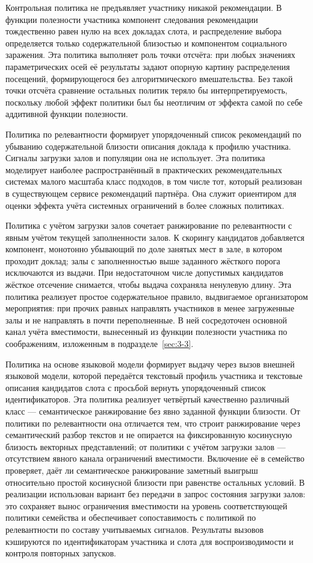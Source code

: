Контрольная политика не предъявляет участнику никакой рекомендации. В функции полезности участника компонент следования рекомендации тождественно равен нулю на всех докладах слота, и распределение выбора определяется только содержательной близостью и компонентом социального заражения. Эта политика выполняет роль точки отсчёта: при любых значениях параметрических осей её результаты задают опорную картину распределения посещений, формирующегося без алгоритмического вмешательства. Без такой точки отсчёта сравнение остальных политик теряло бы интерпретируемость, поскольку любой эффект политики был бы неотличим от эффекта самой по себе аддитивной функции полезности.

Политика по релевантности формирует упорядоченный список рекомендаций по убыванию содержательной близости описания доклада к профилю участника. Сигналы загрузки залов и популяции она не использует. Эта политика моделирует наиболее распространённый в практических рекомендательных системах малого масштаба класс подходов, в том числе тот, который реализован в существующем сервисе рекомендаций партнёра. Она служит ориентиром для оценки эффекта учёта системных ограничений в более сложных политиках.

Политика с учётом загрузки залов сочетает ранжирование по релевантности с явным учётом текущей заполненности залов. К скорингу кандидатов добавляется компонент, монотонно убывающий по доле занятых мест в зале, в котором проходит доклад; залы с заполненностью выше заданного жёсткого порога исключаются из выдачи. При недостаточном числе допустимых кандидатов жёсткое отсечение снимается, чтобы выдача сохраняла ненулевую длину. Эта политика реализует простое содержательное правило, выдвигаемое организатором мероприятия: при прочих равных направлять участников в менее загруженные залы и не направлять в почти переполненные. В ней сосредоточен основной канал учёта вместимости, вынесенный из функции полезности участника по соображениям, изложенным в подразделе~\ref{sec:3-3}.

Политика на основе языковой модели формирует выдачу через вызов внешней языковой модели, которой передаётся текстовый профиль участника и текстовые описания кандидатов слота с просьбой вернуть упорядоченный список идентификаторов. Эта политика реализует четвёртый качественно различный класс --- семантическое ранжирование без явно заданной функции близости. От политики по релевантности она отличается тем, что строит ранжирование через семантический разбор текстов и не опирается на фиксированную косинусную близость векторных представлений; от политики с учётом загрузки залов --- отсутствием явного канала ограничений вместимости. Включение её в семейство проверяет, даёт ли семантическое ранжирование заметный выигрыш относительно простой косинусной близости при равенстве остальных условий. В реализации использован вариант без передачи в запрос состояния загрузки залов: это сохраняет вынос ограничения вместимости на уровень соответствующей политики семейства и обеспечивает сопоставимость с политикой по релевантности по составу учитываемых сигналов. Результаты вызовов кэшируются по идентификаторам участника и слота для воспроизводимости и контроля повторных запусков.

